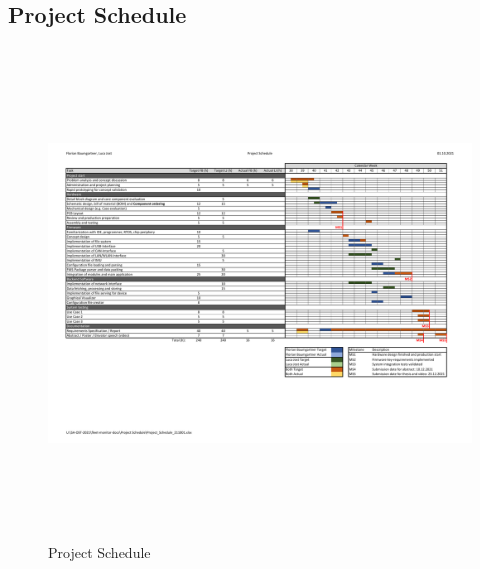\begin{landscape}
    \section{Project Schedule}
    \begin{figure}[h!]
    	\includegraphics[height=13cm, trim=17mm 69mm 25mm 20mm, clip]{appendix/Project_Schedule_211001}
    	\bigskip
    	\caption{Project Schedule}
    	\hfuzz=19.0pt
	    \vspace{-2cm}
	    \label{fig:project_schedule}
    \end{figure}
\end{landscape}
\newpage
\addtolength{\textheight}{\topskip}